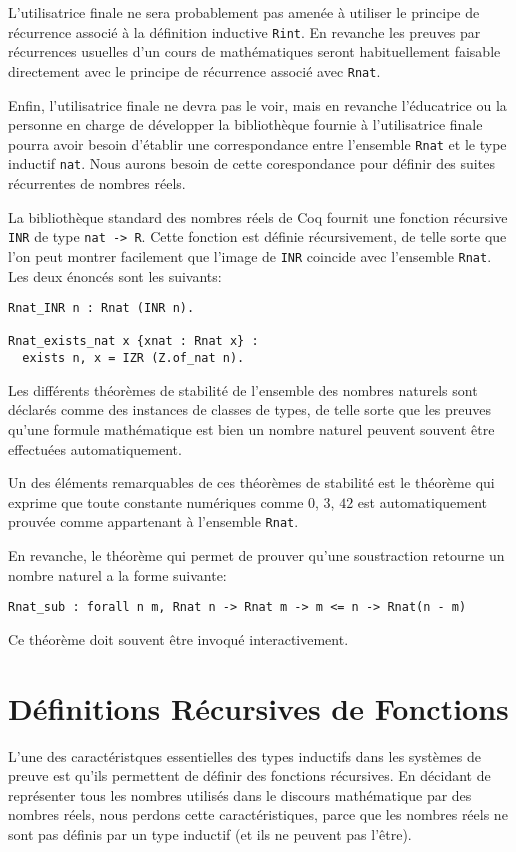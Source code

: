 \documentclass[draft]{jflart}
\begin{document}
L'utilisatrice finale ne sera probablement pas amenée à utiliser le
principe de récurrence associé à la définition inductive \texttt{Rint}.
En revanche les preuves par récurrences usuelles d'un cours de
mathématiques seront habituellement faisable directement avec le
principe de récurrence associé avec \texttt{Rnat}.

Enfin, l'utilisatrice finale ne devra pas le voir, mais en revanche
l'éducatrice ou la personne en charge de développer la bibliothèque
fournie à l'utilisatrice finale pourra avoir besoin d'établir une
correspondance entre l'ensemble \texttt{Rnat} et le type inductif
\texttt{nat}.  Nous aurons besoin de cette corespondance pour définir des
suites récurrentes de nombres réels.

La bibliothèque standard des nombres réels de Coq fournit une fonction
récursive \texttt{INR} de type \texttt{nat -> R}.  Cette fonction est
définie récursivement, de telle sorte que l'on peut montrer facilement
que l'image de \texttt{INR} coincide avec l'ensemble \texttt{Rnat}.  Les
deux énoncés sont les suivants:
\begin{verbatim}
Rnat_INR n : Rnat (INR n).

Rnat_exists_nat x {xnat : Rnat x} :
  exists n, x = IZR (Z.of_nat n).
\end{verbatim}

Les différents théorèmes de stabilité de l'ensemble des nombres naturels
sont déclarés comme des instances de classes de types, de telle sorte que
les preuves qu'une formule mathématique est bien un nombre naturel peuvent
souvent être effectuées automatiquement.

Un des éléments remarquables de ces théorèmes de stabilité est le théorème
qui exprime que toute constante numériques comme \(0\), \(3\), \(42\) est
automatiquement prouvée comme appartenant à l'ensemble \texttt{Rnat}.

En revanche, le théorème qui permet de prouver qu'une soustraction retourne un
nombre naturel a la forme suivante:
\begin{verbatim}
Rnat_sub : forall n m, Rnat n -> Rnat m -> m <= n -> Rnat(n - m)
\end{verbatim}
Ce théorème doit souvent être invoqué interactivement.
\section{Définitions Récursives de Fonctions}
L'une des caractéristques essentielles des types inductifs dans les
systèmes de preuve est qu'ils permettent de définir des fonctions
récursives.  En décidant de représenter tous les nombres utilisés dans
le discours mathématique par des nombres réels, nous perdons cette
caractéristiques, parce que les nombres réels ne sont pas définis par
un type inductif (et ils ne peuvent pas l'être).
\end{document}
